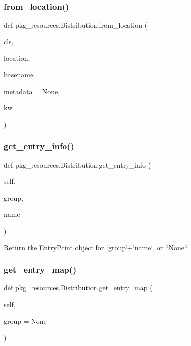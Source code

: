 \subsubsection{\texorpdfstring{from\+\_\+location()}{from\_location()}}
{\footnotesize\ttfamily def pkg\+\_\+resources.\+Distribution.\+from\+\_\+location (\begin{DoxyParamCaption}\item[{}]{cls,  }\item[{}]{location,  }\item[{}]{basename,  }\item[{}]{metadata = {\ttfamily None},  }\item[{}]{kw }\end{DoxyParamCaption})}

\mbox{\label{classpkg__resources_1_1Distribution_a2eb224328a194967021953cd6a122011}} 
\subsubsection{\texorpdfstring{get\+\_\+entry\+\_\+info()}{get\_entry\_info()}}
{\footnotesize\ttfamily def pkg\+\_\+resources.\+Distribution.\+get\+\_\+entry\+\_\+info (\begin{DoxyParamCaption}\item[{}]{self,  }\item[{}]{group,  }\item[{}]{name }\end{DoxyParamCaption})}

\begin{DoxyVerb}Return the EntryPoint object for `group`+`name`, or ``None``\end{DoxyVerb}
 \mbox{\label{classpkg__resources_1_1Distribution_a62bf46d7615519b2b455498257f9d536}} 
\subsubsection{\texorpdfstring{get\+\_\+entry\+\_\+map()}{get\_entry\_map()}}
{\footnotesize\ttfamily def pkg\+\_\+resources.\+Distribution.\+get\+\_\+entry\+\_\+map (\begin{DoxyParamCaption}\item[{}]{self,  }\item[{}]{group = {\ttfamily None} }\end{DoxyParamCaption})}

